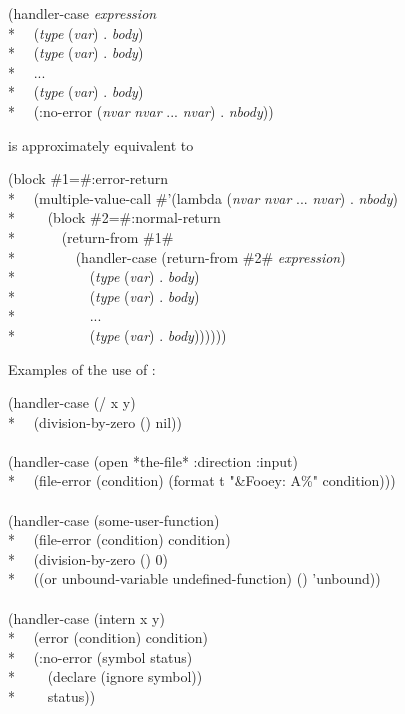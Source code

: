\begin{defmac}
\begin{lisp}
(handler-case {\it expression} \\*
~~({\it type} ({\it var}) . {\it body}) \\*
~~({\it type} ({\it var}) . {\it body}) \\*
~~... \\*
~~({\it type} ({\it var}) . {\it body}) \\*
~~(:no-error ({\it nvar} {\it nvar} ... {\it nvar}) . {\it nbody}))
\end{lisp}
is approximately equivalent to
\begin{lisp}
(block \#1=\#:error-return \\*
~~(multiple-value-call \#'(lambda ({\it nvar} {\it nvar} ... {\it nvar}) . {\it nbody}) \\*
~~~~(block \#2=\#:normal-return \\*
~~~~~~(return-from \#1\# \\*
~~~~~~~~(handler-case (return-from \#2\# {\it expression}) \\*
~~~~~~~~~~({\it type} ({\it var}) . {\it body}) \\*
~~~~~~~~~~({\it type} ({\it var}) . {\it body}) \\*
~~~~~~~~~~... \\*
~~~~~~~~~~({\it type} ({\it var}) . {\it body}))))))
\end{lisp}



  Examples of the use of :
\begin{lisp}
(handler-case (/ x y) \\*
~~(division-by-zero () nil)) \\
 \\
(handler-case (open *the-file* :direction :input) \\*
~~(file-error (condition) (format t "{\Xtilde}\&Fooey: {\Xtilde}A{\Xtilde}\%" condition))) \\
 \\
(handler-case (some-user-function) \\*
~~(file-error (condition) condition) \\*
~~(division-by-zero () 0) \\*
~~((or unbound-variable undefined-function) () 'unbound)) \\
 \\
(handler-case (intern x y) \\*
~~(error (condition) condition) \\*
~~(:no-error (symbol status) \\*
~~~~(declare (ignore symbol)) \\*
~~~~status))
\end{lisp}
\end{defmac}

